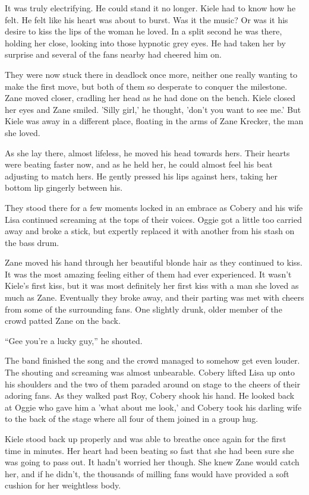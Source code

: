 It was truly electrifying.  He could stand it no longer.  Kiele had to know how he felt.  He felt like his heart was about to burst.  Was it the music?  Or was it his desire to kiss the lips of the woman he loved.  In a split second he was there, holding her close, looking into those hypnotic grey eyes.  He had taken her by surprise and several of the fans nearby had cheered him on.  

They were now stuck there in deadlock once more, neither one really wanting to make the first move, but both of them so desperate to conquer the milestone.  Zane moved closer, cradling her head as he had done on the bench.  Kiele closed her eyes and Zane smiled.  'Silly girl,' he thought, 'don't you want to see me.'  But Kiele was away in a different place, floating in the arms of Zane Krecker, the man she loved.  

As she lay there, almost lifeless, he moved his head towards hers.  Their hearts were beating faster now, and as he held her, he could almost feel his beat adjusting to match hers.  He gently pressed his lips against hers, taking her bottom lip gingerly between his.

They stood there for a few moments locked in an embrace as Cobery and his wife Lisa continued screaming at the tops of their voices.  Oggie got a little too carried away and broke a stick, but expertly replaced it with another from his stash on the bass drum.

Zane moved his hand through her beautiful blonde hair as they continued to kiss.  It was the most amazing feeling either of them had ever experienced.  It wasn't Kiele's first kiss, but it was most definitely her first kiss with a man she loved as much as Zane.  Eventually they broke away, and their parting was met with cheers from some of the surrounding fans.  One slightly drunk, older member of the crowd patted Zane on the back.  

``Gee you're a lucky guy,'' he shouted.

The band finished the song and the crowd managed to somehow get even louder.  The shouting and screaming was almost unbearable.  Cobery lifted Lisa up onto his shoulders and the two of them paraded around on stage to the cheers of their adoring fans.  As they walked past Roy, Cobery shook his hand.  He looked back at Oggie who gave him a 'what about me look,' and Cobery took his darling wife to the back of the stage where all four of them joined in a group hug.  

Kiele stood back up properly and was able to breathe once again for the first time in minutes.  Her heart had been beating so fast that she had been sure she was going to pass out.  It hadn't worried her though.  She knew Zane would catch her, and if he didn't, the thousands of milling fans would have provided a soft cushion for her weightless body.

